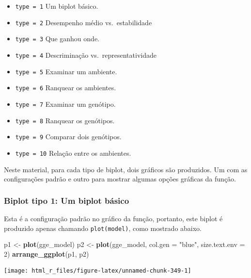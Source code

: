 \documentclass[
]{book}
\newenvironment{Shaded}{\begin{snugshade}}{\end{snugshade}}
\newcommand{\DataTypeTok}[1]{\textcolor[rgb]{0.13,0.29,0.53}{#1}}
\newcommand{\DecValTok}[1]{\textcolor[rgb]{0.00,0.00,0.81}{#1}}
\newcommand{\KeywordTok}[1]{\textcolor[rgb]{0.13,0.29,0.53}{\textbf{#1}}}
\newcommand{\NormalTok}[1]{#1}
\newcommand{\StringTok}[1]{\textcolor[rgb]{0.31,0.60,0.02}{#1}}
\providecommand{\tightlist}{%
  \setlength{\itemsep}{0pt}\setlength{\parskip}{0pt}}
\numberwithin{equation}{section}
\newcommand{\indt}[1]{\index{#1|ST}}
\begin{document}
\begin{itemize}
\tightlist
\item
  \texttt{type\ =\ 1} Um biplot básico.
\item
  \texttt{type\ =\ 2} Desempenho médio vs.~estabilidade
\item
  \texttt{type\ =\ 3} Que ganhou onde.
\item
  \texttt{type\ =\ 4} Descriminação vs.~representatividade
\item
  \texttt{type\ =\ 5} Examinar um ambiente.
\item
  \texttt{type\ =\ 6} Ranquear os ambientes.
\item
  \texttt{type\ =\ 7} Examinar um genótipo.
\item
  \texttt{type\ =\ 8} Ranquear os genótipos.
\item
  \texttt{type\ =\ 9} Comparar dois genótipos.
\item
  \texttt{type\ =\ 10} Relação entre os ambientes.
\end{itemize}

Neste material, para cada tipo de biplot, dois gráficos são produzidos. Um com as configurações padrão e outro para mostrar algumas opções gráficas da função.

\hypertarget{biplot-tipo-1-um-biplot-buxe1sico}{%
\subsubsection{Biplot tipo 1: Um biplot básico}\label{biplot-tipo-1-um-biplot-buxe1sico}}

Esta é a configuração padrão no gráfico da função, portanto, este biplot é produzido apenas chamando \texttt{plot(model)}, como mostrado abaixo.
\indt{biplot}

\begin{Shaded}
\begin{Highlighting}[]
\NormalTok{p1 \textless{}{-}}\StringTok{ }\KeywordTok{plot}\NormalTok{(gge\_model)}
\NormalTok{p2 \textless{}{-}}\StringTok{ }\KeywordTok{plot}\NormalTok{(gge\_model,}
           \DataTypeTok{col.gen =} \StringTok{"blue"}\NormalTok{,}
           \DataTypeTok{size.text.env =} \DecValTok{2}\NormalTok{)}
\KeywordTok{arrange\_ggplot}\NormalTok{(p1, p2)}
\end{Highlighting}
\end{Shaded}

\begin{center}\texttt{[image: html\_r\_files/figure-latex/unnamed-chunk-349-1]} \end{center}
\end{document}
